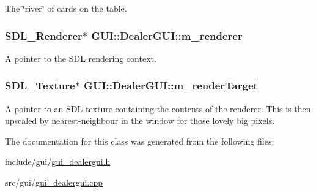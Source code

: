 The \char`\"{}river\char`\"{} of cards on the table. 

\hypertarget{classGUI_1_1DealerGUI_a9e8046ba588810bc65e6df86c20225fc}{
\subsubsection[{m\-\_\-renderer}]{\setlength{\rightskip}{0pt plus 5cm}S\-D\-L\-\_\-\-Renderer$\ast$ G\-U\-I\-::\-Dealer\-G\-U\-I\-::m\-\_\-renderer}}\label{classGUI_1_1DealerGUI_a9e8046ba588810bc65e6df86c20225fc}


A pointer to the S\-D\-L rendering context. 

\hypertarget{classGUI_1_1DealerGUI_aac251d3fe040ccb08cb174a13ef68a35}{
\subsubsection[{m\-\_\-render\-Target}]{\setlength{\rightskip}{0pt plus 5cm}S\-D\-L\-\_\-\-Texture$\ast$ G\-U\-I\-::\-Dealer\-G\-U\-I\-::m\-\_\-render\-Target\hspace{0.3cm}{\ttfamily [private]}}}\label{classGUI_1_1DealerGUI_aac251d3fe040ccb08cb174a13ef68a35}


A pointer to an S\-D\-L texture containing the contents of the renderer. This is then upscaled by nearest-\/neighbour in the window for those lovely big pixels. 



The documentation for this class was generated from the following files\-:\begin{DoxyCompactItemize}
\item 
include/gui/\hyperlink{gui__dealergui_8h}{gui\-\_\-dealergui.\-h}\item 
src/gui/\hyperlink{gui__dealergui_8cpp}{gui\-\_\-dealergui.\-cpp}\end{DoxyCompactItemize}

